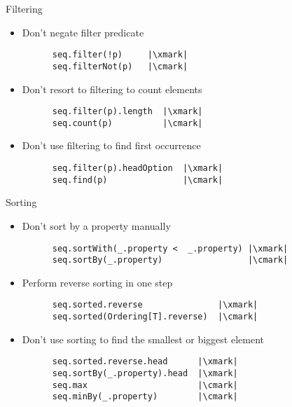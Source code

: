 \documentclass[aspectratio=169]{beamer}
\begin{document}
\begin{frame}[fragile]{Filtering}
  \begin{itemize}
    \item Don’t negate filter predicate\\
      \begin{verbatim}
      seq.filter(!p)     |\xmark|
      seq.filterNot(p)   |\cmark|
      \end{verbatim}
      \pause
    \item Don’t resort to filtering to count elements\\
      \begin{verbatim}
      seq.filter(p).length  |\xmark|
      seq.count(p)          |\cmark|
      \end{verbatim}
      \pause
    \item Don’t use filtering to find first occurrence\\
      \begin{verbatim}
      seq.filter(p).headOption  |\xmark|
      seq.find(p)               |\cmark|
      \end{verbatim}
  \end{itemize}
\end{frame}

\begin{frame}[fragile]{Sorting}
  \begin{itemize}
    \item Don’t sort by a property manually\\
      \begin{verbatim}
      seq.sortWith(_.property <  _.property) |\xmark|
      seq.sortBy(_.property)                 |\cmark|
      \end{verbatim}
      \pause
    \item Perform reverse sorting in one step\\
      \begin{verbatim}
      seq.sorted.reverse               |\xmark|
      seq.sorted(Ordering[T].reverse)  |\cmark|
      \end{verbatim}
      \pause
    \item Don’t use sorting to find the smallest or biggest element\\
      \begin{verbatim}
      seq.sorted.reverse.head      |\xmark|
      seq.sortBy(_.property).head  |\xmark|
      seq.max                      |\cmark|
      seq.minBy(_.property)        |\cmark|
      \end{verbatim}
  \end{itemize}
\end{frame}
\end{document}

